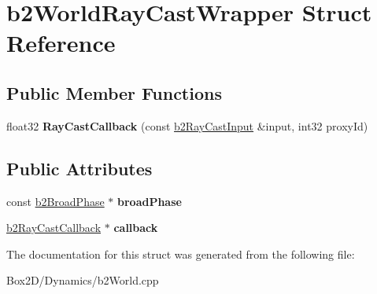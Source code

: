 \hypertarget{structb2_world_ray_cast_wrapper}{}\section{b2\+World\+Ray\+Cast\+Wrapper Struct Reference}
\label{structb2_world_ray_cast_wrapper}
\subsection*{Public Member Functions}
\begin{DoxyCompactItemize}
\item 
\mbox{\label{structb2_world_ray_cast_wrapper_a336aa5b664c3cfea61b0e28066f796d4}} 
float32 {\bfseries Ray\+Cast\+Callback} (const \hyperlink{structb2_ray_cast_input}{b2\+Ray\+Cast\+Input} \&input, int32 proxy\+Id)
\end{DoxyCompactItemize}
\subsection*{Public Attributes}
\begin{DoxyCompactItemize}
\item 
\mbox{\label{structb2_world_ray_cast_wrapper_a8bf380db0756a568bec076e549544145}} 
const \hyperlink{classb2_broad_phase}{b2\+Broad\+Phase} $\ast$ {\bfseries broad\+Phase}
\item 
\mbox{\label{structb2_world_ray_cast_wrapper_a5e6d85af5ae2cda7a8da2306d6b86a3e}} 
\hyperlink{classb2_ray_cast_callback}{b2\+Ray\+Cast\+Callback} $\ast$ {\bfseries callback}
\end{DoxyCompactItemize}


The documentation for this struct was generated from the following file\+:\begin{DoxyCompactItemize}
\item 
Box2\+D/\+Dynamics/b2\+World.\+cpp\end{DoxyCompactItemize}
